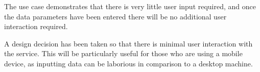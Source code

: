 The use case demonstrates that there is very little user input required, and 
once the data parameters have been entered there will be no additional user 
interaction required.

A design decision has been taken so that there is minimal user interaction with 
the service. This will be particularly useful for those who are using a mobile
device, as inputting data can be laborious in comparison to a desktop machine.
